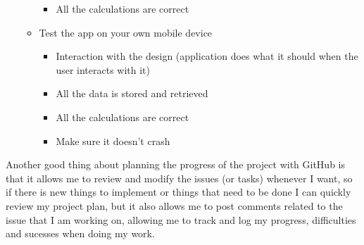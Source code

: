 \begin{itemize}
\begin{itemize}
\begin{itemize}
      \item All the calculations are correct
    \end{itemize}
    \item Test the app on your own mobile device
    \begin{itemize}
      \item Interaction with the design (application does what it should when the user interacts with it)
      \item All the data is stored and retrieved
      \item All the calculations are correct
      \item Make sure it doesn't crash
    \end{itemize}
  \end{itemize}
\end{itemize}

Another good thing about planning the progress of the project with GitHub is that it allows me to review and modify the issues (or tasks) whenever I want, so if there is new things to implement or things that need to be done I can quickly review my project plan, but it also allows me to post comments related to the issue that I am working on, allowing me to track and log my progress, difficulties and sucesses when doing my work.
